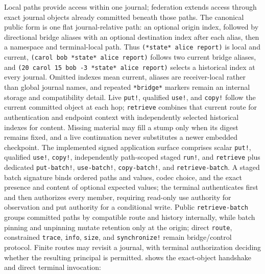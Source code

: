 Local paths provide access within one journal; federation extends access through exact journal objects already committed beneath those paths. The canonical public form is one flat journal-relative path: an optional origin index, followed by directional bridge aliases with an optional destination index after each alias, then a namespace and terminal-local path. Thus \texttt{(*state* alice report)} is local and current, \texttt{(carol bob *state* alice report)} follows two current bridge aliases, and \texttt{(20 carol 15 bob -3 *state* alice report)} selects a historical index at every journal. Omitted indexes mean current, aliases are receiver-local rather than global journal names, and repeated \texttt{*bridge*} markers remain an internal storage and compatibility detail. Live \texttt{put!}, qualified \texttt{use!}, and \texttt{copy!} follow the current committed object at each hop; \texttt{retrieve} combines that current route for authentication and endpoint context with independently selected historical indexes for content. Missing material may fill a stump only when its digest remains fixed, and a live continuation never substitutes a newer embedded checkpoint. The implemented signed application surface comprises scalar \texttt{put!}, qualified \texttt{use!}, \texttt{copy!}, independently path-scoped staged \texttt{run!}, and \texttt{retrieve} plus dedicated \texttt{put-batch!}, \texttt{use-batch!}, \texttt{copy-batch!}, and \texttt{retrieve-batch}. A staged batch signature binds ordered paths and values, codec choice, and the exact presence and content of optional expected values; the terminal authenticates first and then authorizes every member, requiring read-only use authority for observation and put authority for a conditional write. Public \texttt{retrieve-batch} groups committed paths by compatible route and history internally, while batch pinning and unpinning mutate retention only at the origin; direct \texttt{route}, constrained \texttt{trace}, \texttt{info}, \texttt{size}, and \texttt{synchronize!} remain bridge/control protocol. Finite routes may revisit a journal, with terminal authorization deciding whether the resulting principal is permitted.  shows the exact-object handshake and direct terminal invocation:

